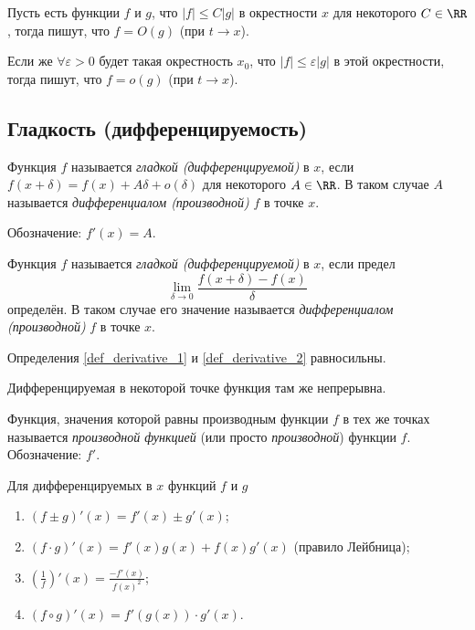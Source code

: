\documentclass[12pt,a4paper]{article}
\begin{document}
    \begin{definition}
        Пусть есть функции $f$ и $g$, что $|f| \leqslant C|g|$ в окрестности $x$ для некоторого $C \in \RR$, тогда пишут, что $f = O(g)$ (при $t \to x$).
        
        Если же $\forall \varepsilon > 0$ будет такая окрестность $x_0$, что $|f| \leqslant \varepsilon |g|$ в этой окрестности, тогда пишут, что $f = o(g)$ (при $t \to x$).
    \end{definition}

    \subsection{Гладкость (дифференцируемость)}

    \begin{definition}\label{def_derivative_1}
        Функция $f$ называется \emph{гладкой (дифференцируемой)} в $x$, если $f(x + \delta) = f(x) + A \delta + o(\delta)$ для некоторого $A \in \RR$. В таком случае $A$ называется \emph{дифференциалом (производной)} $f$ в точке $x$.

        Обозначение: $f'(x) = A$.
    \end{definition}

    \begin{definition}\label{def_derivative_2}
        Функция $f$ называется \emph{гладкой (дифференцируемой)} в $x$, если предел
        \[\lim\limits_{\delta \to 0} \frac{f(x+\delta) - f(x)}{\delta}\]
        определён. В таком случае его значение называется \emph{дифференциалом (производной)} $f$ в точке $x$.
    \end{definition}

    \begin{statement}
        Определения \ref{def_derivative_1} и \ref{def_derivative_2} равносильны.
    \end{statement}

    \begin{statement}
        Дифференцируемая в некоторой точке функция там же непрерывна.
    \end{statement}

    \begin{definition}  
        Функция, значения которой равны производным функции $f$ в тех же точках называется \emph{производной функцией} (или просто \emph{производной}) функции $f$. Обозначение: $f'$.
    \end{definition}

    \begin{lemma}
        Для дифференцируемых в $x$ функций $f$ и $g$
        \begin{enumerate}
            \item $(f \pm g)'(x) = f'(x) \pm g'(x)$;
            \item $(f \cdot g)'(x) = f'(x) g(x) + f(x) g'(x)$ (правило Лейбница);
            \item $(\frac{1}{f})'(x) = \frac{-f'(x)}{f(x)^2}$;
            \item $(f \circ g)'(x) = f'(g(x))\cdot g'(x)$.
        \end{enumerate}
    \end{lemma}
\end{document}
